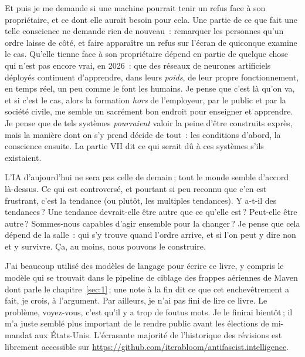 Et puis je me demande si une machine pourrait tenir un refus face à son propriétaire, et ce dont elle aurait besoin pour cela. Une partie de ce que fait une telle conscience ne demande rien de nouveau~: remarquer les personnes qu'un ordre laisse de côté, et faire apparaître un refus sur l'écran de quiconque examine le cas. Qu'elle tienne face à son propriétaire dépend en partie de quelque chose qui n'est pas encore vrai, en 2026~: que des réseaux de neurones artificiels déployés continuent d'apprendre, dans leurs \emph{poids}, de leur propre fonctionnement, en temps réel, un peu comme le font les humains. Je pense que c'est là qu'on va, et si c'est le cas, alors la formation \emph{hors} de l'employeur, par le public et par la société civile, me semble un sacrément bon endroit pour enseigner et apprendre. Je pense que de tels systèmes \emph{pourraient} valoir la peine d'être construits exprès, mais la manière dont on s'y prend décide de tout~: les conditions d'abord, la conscience ensuite. La partie VII dit ce qui serait dû à ces systèmes s'ils existaient.

L'IA d'aujourd'hui ne sera pas celle de demain\,; tout le monde semble d'accord là-dessus. Ce qui est controversé, et pourtant si peu reconnu que c'en est frustrant, c'est la tendance (ou plutôt, les multiples tendances). Y a-t-il des tendances\,? Une tendance devrait-elle être autre que ce qu'elle est\,? Peut-elle être autre\,? Sommes-nous capables d'agir ensemble pour la changer\,? Je pense que cela dépend de la salle~: qui s'y trouve quand l'ordre arrive, et si l'on peut y dire non et y survivre. Ça, au moins, nous pouvons le construire.

J'ai beaucoup utilisé des modèles de langage pour écrire ce livre, y compris le modèle qui se trouvait dans le pipeline de ciblage des frappes aériennes de Maven dont parle le chapitre~\ref{sec:1}\,; une note à la fin dit ce que cet enchevêtrement a fait, je crois, à l'argument. Par ailleurs, je n'ai pas fini de lire ce livre. Le problème, voyez-vous, c'est qu'il y a trop de foutus mots. Je le finirai bientôt\,; il m'a juste semblé plus important de le rendre public avant les élections de mi-mandat aux États-Unis. L'écrasante majorité de l'historique des révisions est librement accessible sur \url{https://github.com/iterabloom/antifascist.intelligence}.
